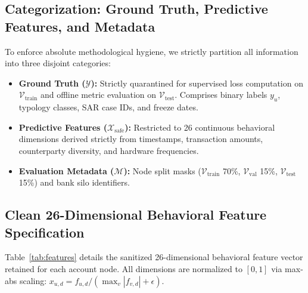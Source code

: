 \documentclass[conference]{IEEEtran}
\begin{document}
\subsection{Categorization: Ground Truth, Predictive Features, and Metadata}
To enforce absolute methodological hygiene, we strictly partition all information into three disjoint categories:
\begin{itemize}
    \item \textbf{Ground Truth ($\mathcal{Y}$):} Strictly quarantined for supervised loss computation on $\mathcal{V}_{\text{train}}$ and offline metric evaluation on $\mathcal{V}_{\text{test}}$. Comprises binary labels $y_u$, typology classes, SAR case IDs, and freeze dates.
    \item \textbf{Predictive Features ($\mathcal{X}_{\text{safe}}$):} Restricted to 26 continuous behavioral dimensions derived strictly from timestamps, transaction amounts, counterparty diversity, and hardware frequencies.
    \item \textbf{Evaluation Metadata ($\mathcal{M}$):} Node split masks ($\mathcal{V}_{\text{train}}$ 70\%, $\mathcal{V}_{\text{val}}$ 15\%, $\mathcal{V}_{\text{test}}$ 15\%) and bank silo identifiers.
\end{itemize}

\subsection{Clean 26-Dimensional Behavioral Feature Specification}
Table~\ref{tab:features} details the sanitized 26-dimensional behavioral feature vector retained for each account node. All dimensions are normalized to $[0, 1]$ via max-abs scaling: $x_{u, d} = f_{u, d} / (\max_v |f_{v, d}| + \epsilon)$.
\end{document}
